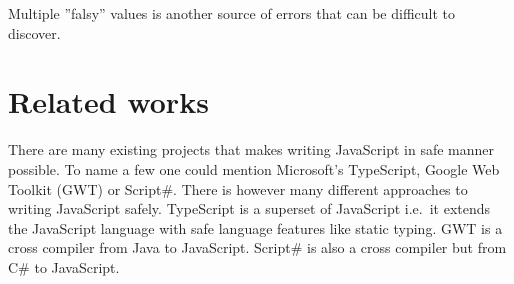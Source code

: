 		Multiple ''falsy'' values is another source of errors that can be difficult to discover.

\section{Related works} %
\label{sec:related_works}
	There are many existing projects that makes writing JavaScript in safe manner possible. To name a few one could mention Microsoft’s TypeScript, Google Web Toolkit (GWT) or Script\#. There is however many different approaches to writing JavaScript safely. TypeScript is a superset of JavaScript i.e.\ it extends the JavaScript language with safe language features like static typing. GWT is a cross compiler from Java to JavaScript. Script\# is also a cross compiler but from C\# to JavaScript.

